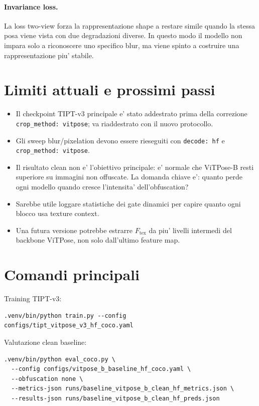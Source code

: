 \documentclass[11pt,a4paper]{article}
\newcommand{\code}[1]{\texttt{#1}}
\newcommand{\tipt}{TIPT-v3}
\newcommand{\vitpose}{ViTPose-B}
\begin{document}
\paragraph{Invariance loss.}
La loss two-view forza la rappresentazione shape a restare simile quando la
stessa posa viene vista con due degradazioni diverse. In questo modo il modello
non impara solo a riconoscere uno specifico blur, ma viene spinto a costruire
una rappresentazione piu' stabile.

\section{Limiti attuali e prossimi passi}

\begin{itemize}[leftmargin=1.2em]
  \item Il checkpoint \tipt{} principale e' stato addestrato prima della
  correzione \code{crop\_method: vitpose}; va riaddestrato con il nuovo
  protocollo.
  \item Gli sweep blur/pixelation devono essere rieseguiti con
  \code{decode: hf} e \code{crop\_method: vitpose}.
  \item Il risultato clean non e' l'obiettivo principale: e' normale che
  \vitpose{} resti superiore su immagini non offuscate. La domanda chiave e':
  quanto perde ogni modello quando cresce l'intensita' dell'obfuscation?
  \item Sarebbe utile loggare statistiche dei gate dinamici per capire quanto
  ogni blocco usa texture context.
  \item Una futura versione potrebbe estrarre $F_{\mathrm{tex}}$ da piu' livelli
  intermedi del backbone ViTPose, non solo dall'ultimo feature map.
\end{itemize}

\section{Comandi principali}

Training \tipt{}:

\begin{verbatim}
.venv/bin/python train.py --config configs/tipt_vitpose_v3_hf_coco.yaml
\end{verbatim}

Valutazione clean baseline:

\begin{verbatim}
.venv/bin/python eval_coco.py \
  --config configs/vitpose_b_baseline_hf_coco.yaml \
  --obfuscation none \
  --metrics-json runs/baseline_vitpose_b_clean_hf_metrics.json \
  --results-json runs/baseline_vitpose_b_clean_hf_preds.json
\end{verbatim}
\end{document}
